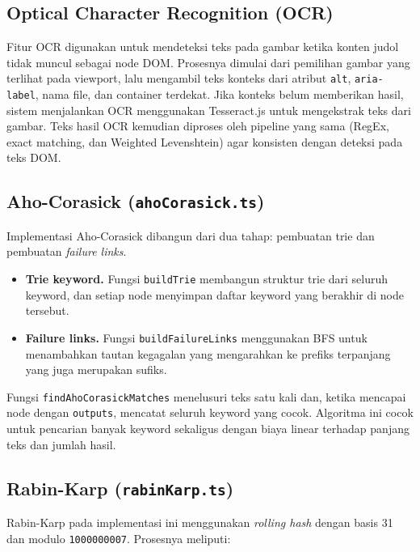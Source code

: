 \subsection{Optical Character Recognition (OCR)}

Fitur OCR digunakan untuk mendeteksi teks pada gambar ketika konten judol
tidak muncul sebagai node DOM. Prosesnya dimulai dari pemilihan gambar yang
terlihat pada viewport, lalu mengambil teks konteks dari atribut \texttt{alt},
\texttt{aria-label}, nama file, dan container terdekat. Jika konteks belum
memberikan hasil, sistem menjalankan OCR menggunakan Tesseract.js untuk
mengekstrak teks dari gambar. Teks hasil OCR kemudian diproses oleh pipeline
yang sama (RegEx, exact matching, dan Weighted Levenshtein) agar konsisten
dengan deteksi pada teks DOM.

\subsection{Aho-Corasick (\texttt{ahoCorasick.ts})}

Implementasi Aho-Corasick dibangun dari dua tahap: pembuatan trie dan
pembuatan \textit{failure links}.

\begin{itemize}
	\item \textbf{Trie keyword.} Fungsi \texttt{buildTrie} membangun struktur
	trie dari seluruh keyword, dan setiap node menyimpan daftar keyword yang
	berakhir di node tersebut.

	\item \textbf{Failure links.} Fungsi \texttt{buildFailureLinks} menggunakan
	BFS untuk menambahkan tautan kegagalan yang mengarahkan ke prefiks terpanjang
	yang juga merupakan sufiks.
\end{itemize}

Fungsi \texttt{findAhoCorasickMatches} menelusuri teks satu kali dan, ketika
mencapai node dengan \texttt{outputs}, mencatat seluruh keyword yang cocok.
Algoritma ini cocok untuk pencarian banyak keyword sekaligus dengan biaya
linear terhadap panjang teks dan jumlah hasil.

\subsection{Rabin-Karp (\texttt{rabinKarp.ts})}

Rabin-Karp pada implementasi ini menggunakan \textit{rolling hash} dengan
basis 31 dan modulo \texttt{1000000007}. Prosesnya meliputi:

